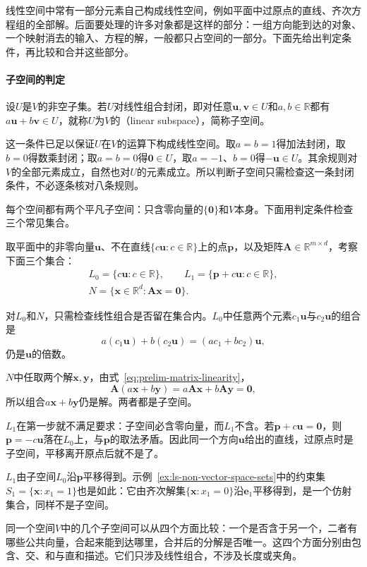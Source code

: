 线性空间中常有一部分元素自己构成线性空间，例如平面中过原点的直线、齐次方程组的全部解。后面要处理的许多对象都是这样的部分：一组方向能到达的对象、一个映射消去的输入、方程的解，一般都只占空间的一部分。下面先给出判定条件，再比较和合并这些部分。

\paragraph{子空间的判定}
设$U$是$V$的非空子集。若$U$对线性组合封闭，即对任意$\bm u,\bm v\in U$和$a,b\in\mathbb R$都有$a\bm u+b\bm v\in U$，就称$U$为$V$的（linear subspace），简称子空间。

这一条件已足以保证$U$在$V$的运算下构成线性空间。取$a=b=1$得加法封闭，取$b=0$得数乘封闭；取$a=b=0$得$\bm0\in U$，取$a=-1$、$b=0$得$-\bm u\in U$。其余规则对$V$的全部元素成立，自然也对$U$的元素成立。所以判断子空间只需检查这一条封闭条件，不必逐条核对八条规则。

每个空间都有两个平凡子空间：只含零向量的$\{\bm0\}$和$V$本身。下面用判定条件检查三个常见集合。
\begin{example}
\label{ex:ls-subspace-checks}
取平面中的非零向量$\bm u$、不在直线$\{c\bm u:c\in\mathbb R\}$上的点$\bm p$，以及矩阵$\bm A\in\mathbb R^{m\times d}$，考察下面三个集合：
\[
 \begin{gathered}
 L_0=\{c\bm u:c\in\mathbb R\},
 \qquad
 L_1=\{\bm p+c\bm u:c\in\mathbb R\},\\
 N=\{\bm x\in\mathbb R^d:\bm A\bm x=\bm0\}.
 \end{gathered}
\]

对$L_0$和$N$，只需检查线性组合是否留在集合内。$L_0$中任意两个元素$c_1\bm u$与$c_2\bm u$的组合是
\[
 a(c_1\bm u)+b(c_2\bm u)=(ac_1+bc_2)\bm u,
\]
仍是$\bm u$的倍数。

$N$中任取两个解$\bm x,\bm y$，由式~\eqref{eq:prelim-matrix-linearity}，
\[
 \bm A(a\bm x+b\bm y)=a\bm A\bm x+b\bm A\bm y=\bm0,
\]
所以组合$a\bm x+b\bm y$仍是解。两者都是子空间。

$L_1$在第一步就不满足要求：子空间必含零向量，而$L_1$不含。若$\bm p+c\bm u=\bm0$，则$\bm p=-c\bm u$落在$L_0$上，与$\bm p$的取法矛盾。因此同一个方向$\bm u$给出的直线，过原点时是子空间，平移离开原点后就不是了。
\end{example}
$L_1$由子空间$L_0$沿$\bm p$平移得到。示例~\ref{ex:ls-non-vector-space-sets}中的约束集$S_1=\{\bm x:x_1=1\}$也是如此：它由齐次解集$\{\bm x:x_1=0\}$沿$\bm e_1$平移得到，是一个仿射集合，同样不是子空间。

同一个空间$V$中的几个子空间可以从四个方面比较：一个是否含于另一个，二者有哪些公共向量，合起来能到达哪里，合并后的分解是否唯一。这四个方面分别由包含、交、和与直和描述。它们只涉及线性组合，不涉及长度或夹角。

